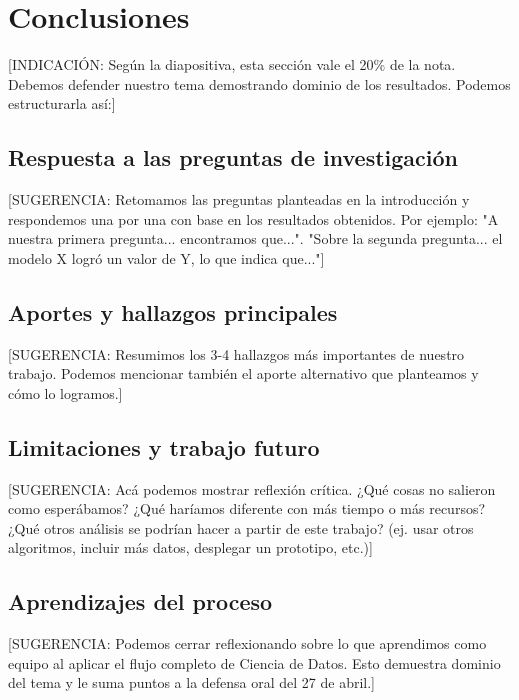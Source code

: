 \section{Conclusiones}

[INDICACIÓN: Según la diapositiva, esta sección vale el 20\% de la nota. Debemos defender nuestro tema demostrando dominio de los resultados. Podemos estructurarla así:]

\subsection{Respuesta a las preguntas de investigación}

[SUGERENCIA: Retomamos las preguntas planteadas en la introducción y respondemos una por una con base en los resultados obtenidos. Por ejemplo: "A nuestra primera pregunta... encontramos que...". "Sobre la segunda pregunta... el modelo X logró un valor de Y, lo que indica que..."]

\subsection{Aportes y hallazgos principales}

[SUGERENCIA: Resumimos los 3-4 hallazgos más importantes de nuestro trabajo. Podemos mencionar también el aporte alternativo que planteamos y cómo lo logramos.]

\subsection{Limitaciones y trabajo futuro}

[SUGERENCIA: Acá podemos mostrar reflexión crítica. ¿Qué cosas no salieron como esperábamos? ¿Qué haríamos diferente con más tiempo o más recursos? ¿Qué otros análisis se podrían hacer a partir de este trabajo? (ej. usar otros algoritmos, incluir más datos, desplegar un prototipo, etc.)]

\subsection{Aprendizajes del proceso}

[SUGERENCIA: Podemos cerrar reflexionando sobre lo que aprendimos como equipo al aplicar el flujo completo de Ciencia de Datos. Esto demuestra dominio del tema y le suma puntos a la defensa oral del 27 de abril.]
